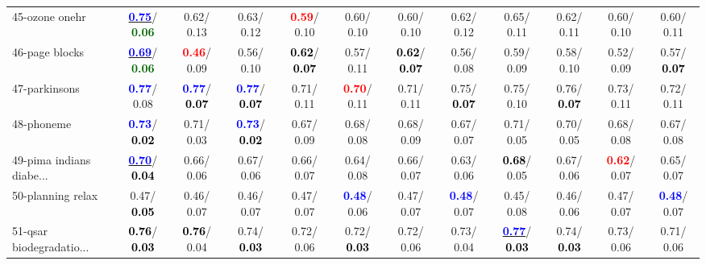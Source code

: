 \begin{table}[h]
\begin{center}
{\begin{tabular}{lc|c|c|c|c|c|c|c|c|c|c}
45-ozone onehr & \underline{\textcolor{blue}{\textbf{  0.75}}}/\textcolor{darkgreen}{\textbf{  0.06}} &   0.62/  0.13 &   0.63/  0.12 & \textcolor{red}{\textbf{  0.59}}/  0.10 &   0.60/  0.10 &   0.60/  0.10 &   0.62/  0.12 &   0.65/  0.11 &   0.62/  0.11 &   0.60/  0.10 &   0.60/  0.11 \\
46-page blocks & \underline{\textcolor{blue}{\textbf{  0.69}}}/\textcolor{darkgreen}{\textbf{  0.06}} & \textcolor{red}{\textbf{  0.46}}/  0.09 &   0.56/  0.10 & \textcolor{black}{\textbf{  0.62}}/\textcolor{black}{\textbf{  0.07}} &   0.57/  0.11 & \textcolor{black}{\textbf{  0.62}}/\textcolor{black}{\textbf{  0.07}} &   0.56/  0.08 &   0.59/  0.09 &   0.58/  0.10 &   0.52/  0.09 &   0.57/\textcolor{black}{\textbf{  0.07}} \\ \hline
47-parkinsons & \textcolor{blue}{\textbf{  0.77}}/  0.08 & \textcolor{blue}{\textbf{  0.77}}/\textcolor{black}{\textbf{  0.07}} & \textcolor{blue}{\textbf{  0.77}}/\textcolor{black}{\textbf{  0.07}} &   0.71/  0.11 & \textcolor{red}{\textbf{  0.70}}/  0.11 &   0.71/  0.11 &   0.75/\textcolor{black}{\textbf{  0.07}} &   0.75/  0.10 &   0.76/\textcolor{black}{\textbf{  0.07}} &   0.73/  0.11 &   0.72/  0.11 \\
48-phoneme & \textcolor{blue}{\textbf{  0.73}}/\textcolor{black}{\textbf{  0.02}} &   0.71/  0.03 & \textcolor{blue}{\textbf{  0.73}}/\textcolor{black}{\textbf{  0.02}} &   0.67/  0.09 &   0.68/  0.08 &   0.68/  0.09 &   0.67/  0.07 &   0.71/  0.05 &   0.70/  0.05 &   0.68/  0.08 &   0.67/  0.08 \\
49-pima indians diabe... & \underline{\textcolor{blue}{\textbf{  0.70}}}/\textcolor{black}{\textbf{  0.04}} &   0.66/  0.06 &   0.67/  0.06 &   0.66/  0.07 &   0.64/  0.08 &   0.66/  0.07 &   0.63/  0.06 & \textcolor{black}{\textbf{  0.68}}/  0.05 &   0.67/  0.06 & \textcolor{red}{\textbf{  0.62}}/  0.07 &   0.65/  0.07 \\
50-planning relax &   0.47/\textcolor{black}{\textbf{  0.05}} &   0.46/  0.07 &   0.46/  0.07 &   0.47/  0.07 & \textcolor{blue}{\textbf{  0.48}}/  0.06 &   0.47/  0.07 & \textcolor{blue}{\textbf{  0.48}}/  0.07 &   0.45/  0.08 &   0.46/  0.06 &   0.47/  0.07 & \textcolor{blue}{\textbf{  0.48}}/  0.07 \\
51-qsar biodegradatio... & \textcolor{black}{\textbf{  0.76}}/\textcolor{black}{\textbf{  0.03}} & \textcolor{black}{\textbf{  0.76}}/  0.04 &   0.74/\textcolor{black}{\textbf{  0.03}} &   0.72/  0.06 &   0.72/\textcolor{black}{\textbf{  0.03}} &   0.72/  0.06 &   0.73/  0.04 & \underline{\textcolor{blue}{\textbf{  0.77}}}/\textcolor{black}{\textbf{  0.03}} &   0.74/\textcolor{black}{\textbf{  0.03}} &   0.73/  0.06 &   0.71/  0.06 \\

\end{tabular}}
\end{center}
\end{table}
